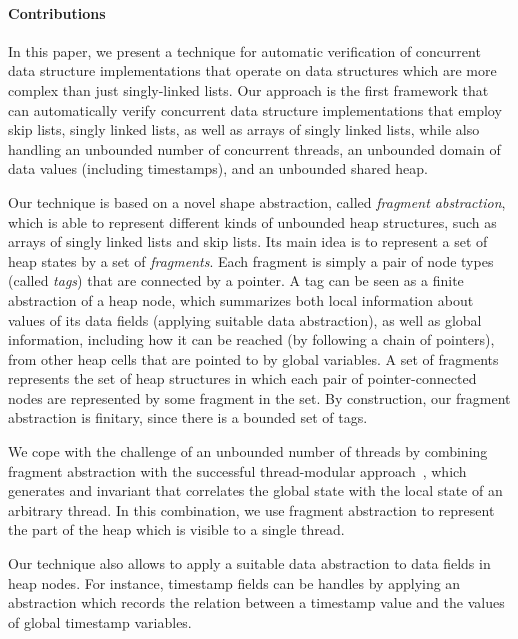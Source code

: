 \paragraph{Contributions}
In this paper, we present a technique for automatic verification of concurrent
data structure implementations that operate on data structures which are more
complex than just singly-linked lists.  Our approach is the first framework that
can automatically verify concurrent data structure implementations that employ
skip lists, singly linked lists, as well as arrays of singly linked lists,
while also handling an unbounded
number of concurrent threads, an unbounded domain of data values
(including timestamps), and an unbounded shared heap.

Our technique is based on a novel shape abstraction,
called {\em fragment abstraction}, which is able to represent
different kinds of unbounded heap structures, such as arrays of singly linked
lists and skip lists.
Its main idea is to represent a set of heap states by a set of {\em fragments}.
Each fragment is simply a pair of node types (called {\em tags}) that are
connected by a pointer. A tag can be seen as a finite abstraction of
a heap node, which summarizes both local information about
values of its data fields (applying suitable data abstraction),
as well as global information, including how
it can be reached (by following a chain of pointers),
from other heap cells that are pointed to by global variables.
A set of fragments represents the set of heap structures in which each
pair of pointer-connected nodes are represented by some fragment in the set.
By construction, our fragment abstraction is finitary, since there is
a bounded set of tags.

We cope with the challenge of an unbounded number of threads by combining
fragment abstraction with
the successful thread-modular approach~\cite{BLMRS:cav08}, which
generates and invariant that correlates the global state with the local state of
an arbitrary thread. 
In this combination, we use fragment abstraction to represent the part of the
heap which is visible to a single thread.

Our technique also allows to apply a suitable data abstraction to data fields
in heap nodes. For instance, timestamp fields can be handles by applying
an abstraction which records the relation between a timestamp value and the values of global timestamp variables.

